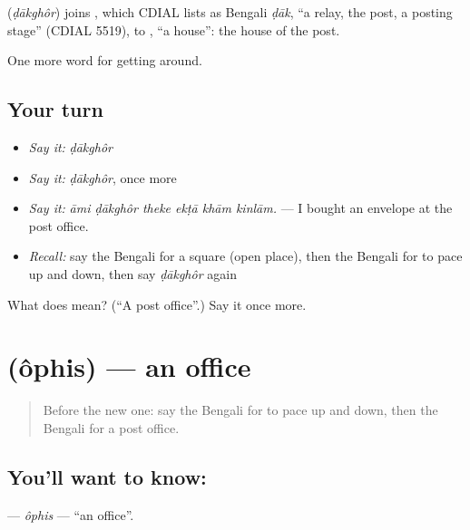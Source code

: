 \begin{cousinweb}
\textbf{} (\emph{ḍākghôr}) joins , which CDIAL lists as Bengali \emph{ḍāk}, \textquotedblleft{}a relay, the post, a posting stage\textquotedblright{} (CDIAL 5519), to \textbf{}, \textquotedblleft{}a house\textquotedblright{}: the house of the post.
\end{cousinweb}

\begin{grammarlens}[title={What you've built}]
One more word for getting around.
\end{grammarlens}

\subsection*{Your turn}
\begin{itemize}
\raggedright
  \item \emph{Say it:} \emph{ḍākghôr}
  \item \emph{Say it:} \emph{ḍākghôr}, once more
  \item \emph{Say it:} \emph{āmi ḍākghôr theke ekṭā khām kinlām.} — I bought an envelope at the post office.
  \item \emph{Recall:} say the Bengali for a square (open place), then the Bengali for to pace up and down, then say \emph{ḍākghôr} again
\end{itemize}

\begin{tcolorbox}[breakable,colback=teal!4,colframe=teal!35!black,title={Before you move on}]
What does  mean? (\textquotedblleft{}A post office\textquotedblright{}.) Say it once more.
\end{tcolorbox}
\section[\texorpdfstring{\bn{অফিস} (ôphis)}{অফিস (ôphis)}]{ (ôphis) — an office}

\label{lesson:BN-C411-ophis}



\begin{quote}
Before the new one: say the Bengali for to pace up and down, then the Bengali for a post office.
\end{quote}

\subsection*{You'll want to know: }
\textbf{} — \emph{ôphis} — \textquotedblleft{}an office\textquotedblright{}.


